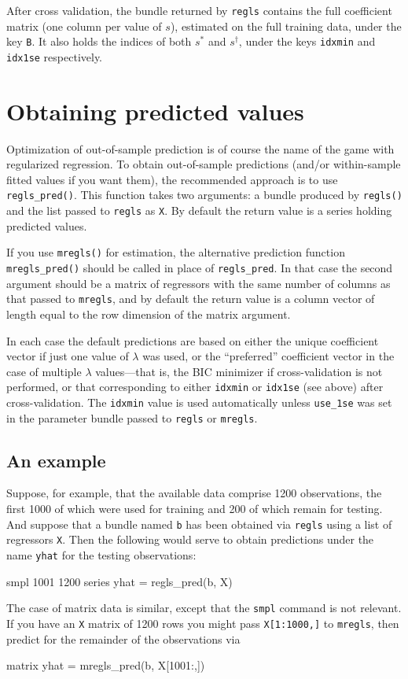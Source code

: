 \documentclass{article}
\begin{document}
After cross validation, the bundle returned by \texttt{regls} contains
the full coefficient matrix (one column per value of $s$), estimated
on the full training data, under the key \texttt{B}.  It also holds
the indices of both $s^*$ and $s^{\dagger}$, under the keys
\texttt{idxmin} and \texttt{idx1se} respectively.

\section{Obtaining predicted values}
\label{sec:predict}

Optimization of out-of-sample prediction is of course the name of the
game with regularized regression. To obtain out-of-sample predictions
(and/or within-sample fitted values if you want them), the recommended
approach is to use \texttt{regls\_pred()}. This function takes two
arguments: a bundle produced by \texttt{regls()} and the list passed
to \texttt{regls} as \texttt{X}. By default the return value is a
series holding predicted values.

If you use \texttt{mregls()} for estimation, the alternative
prediction function \texttt{mregls\_pred()} should be called in place
of \texttt{regls\_pred}. In that case the second argument should be a
matrix of regressors with the same number of columns as that passed to
\texttt{mregls}, and by default the return value is a column vector of
length equal to the row dimension of the matrix argument.

In each case the default predictions are based on either the unique
coefficient vector if just one value of $\lambda$ was used, or the
``preferred'' coefficient vector in the case of multiple $\lambda$
values---that is, the BIC minimizer if cross-validation is not
performed, or that corresponding to either \texttt{idxmin} or
\texttt{idx1se} (see above) after cross-validation. The
\texttt{idxmin} value is used automatically unless \texttt{use\_1se}
was set in the parameter bundle passed to \texttt{regls} or
\texttt{mregls}.

\subsection{An example}

Suppose, for example, that the available data comprise 1200
observations, the first 1000 of which were used for training and 200
of which remain for testing. And suppose that a bundle named
\texttt{b} has been obtained via \texttt{regls} using a list of
regressors \texttt{X}. Then the following would serve to obtain
predictions under the name \texttt{yhat} for the testing observations:
\begin{code}
smpl 1001 1200
series yhat = regls_pred(b, X)
\end{code}
The case of matrix data is similar, except that the \texttt{smpl}
command is not relevant. If you have an \texttt{X} matrix of 1200 rows
you might pass \texttt{X[1:1000,]} to \texttt{mregls}, then predict
for the remainder of the observations via
\begin{code}
matrix yhat = mregls_pred(b, X[1001:,])
\end{code}
\end{document}
